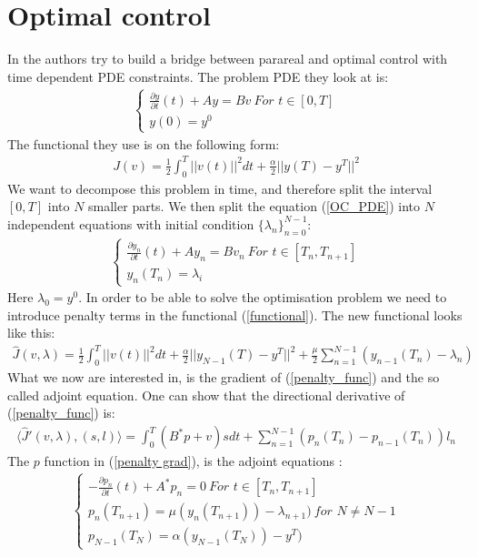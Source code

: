 \documentclass[11pt,a4paper]{article}
\begin{document}
\section{Optimal control}
In \cite{maday2002parareal} the authors try to build a bridge between parareal and optimal control with time dependent PDE constraints. The problem PDE they look at is:
\begin{align}
\left\{
     \begin{array}{lr}
		\frac{\partial y}{\partial t}(t)+Ay=Bv  \ \textit{For $t \in [0,T]$}\\
		y(0)=y^0
	\end{array}
\right. \label{OC_PDE}
\end{align}
The functional they use is on the following form:
\begin{align}
J(v) = \frac{1}{2}\int_0^T ||v(t)||^2 dt + \frac{\alpha}{2}||y(T)-y^T||^2 \label{functional}
\end{align} 
We want to decompose this problem in time, and therefore split the interval $[0,T]$ into $N$ smaller parts. We then split the equation (\ref{OC_PDE}) into $N$ independent equations with initial condition $\{\lambda_n\}_{n=0}^{N-1}$:
\begin{align}
\left\{
     \begin{array}{lr}
		\frac{\partial y_n}{\partial t}(t)+Ay_n=Bv_n  \ \textit{For $t \in [T_n,T_{n+1}]$}\\
		y_{n}(T_n)=\lambda_i
	\end{array}
\right. \label{OC_PPDE}
\end{align} 
Here $\lambda_0=y^0$. In order to be able to solve the optimisation problem we need to introduce penalty terms in the functional (\ref{functional}). The new functional looks like this:
\begin{align}
\hat{J}(v,\lambda) = \frac{1}{2}\int_0^T ||v(t)||^2 dt + \frac{\alpha}{2}||y_{N-1}(T)-y^T||^2 + \frac{\mu}{2}\sum_{n=1}^{N-1} (y_{n-1}(T_{n})-\lambda_{n}) \label{penalty_func}
\end{align} 
What we now are interested in, is the gradient of (\ref{penalty_func}) and the so called adjoint equation. One can show that the directional derivative of (\ref{penalty_func}) is:
\begin{align}
\langle\hat{J}'(v,\lambda),(s,l) \rangle = \int_0^T (B^*p+v)sdt + \sum_{n=1}^{N-1}(p_n(T_n) - p_{n-1}(T_n))l_n \label{penalty grad}
\end{align} 
The $p$ function in (\ref{penalty grad}), is the adjoint equations :
\begin{align}
\left\{
     \begin{array}{lr}
		-\frac{\partial p_n}{\partial t}(t)+A^*p_n=0  \ \textit{For $t \in [T_n,T_{n+1}]$}\\
		p_{n}(T_{n+1}) = \mu(y_n(T_{n+1})) -\lambda_{n+1}) \ \textit{for $N\neq N-1$} \\
		p_{N-1}(T_N)=\alpha(y_{N-1}(T_{N}))-y^T) 
	\end{array}
\right. 
\end{align}\label{adjoints}
\end{document}
